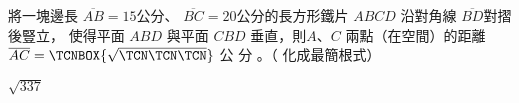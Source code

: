 \begin{QUESTIONS}
\begin{QUESTION}
        \begin{ExamAnsRateInfo}{}{}{}{}
        \end{ExamAnsRateInfo}
        \begin{QBODY}
            將一塊邊長 $\overline{AB} = 15$公分、 $\overline{BC} = 20$公分的長方形鐵片 $ABCD$ 沿對角線 $\overline{BD}$對摺後豎立，
            使得平面 $ABD$ 與平面 $CBD$ 垂直，則$A$、$C$ 兩點（在空間）的距離$\overline{AC}=\TCNBOX{\sqrt{\TCN\TCN\TCN}}$
            公 分 。（ 化成最簡根式）
        \end{QBODY}
        \begin{QFROMS}
        \end{QFROMS}
        \begin{QTAGS}\end{QTAGS}
        \begin{QANS}
            $\sqrt{337}$
        \end{QANS}
        \begin{QSOLLIST}
        \end{QSOLLIST}
        \begin{QEMPTYSPACE}
        \end{QEMPTYSPACE}
    \end{QUESTION}
\end{QUESTIONS}